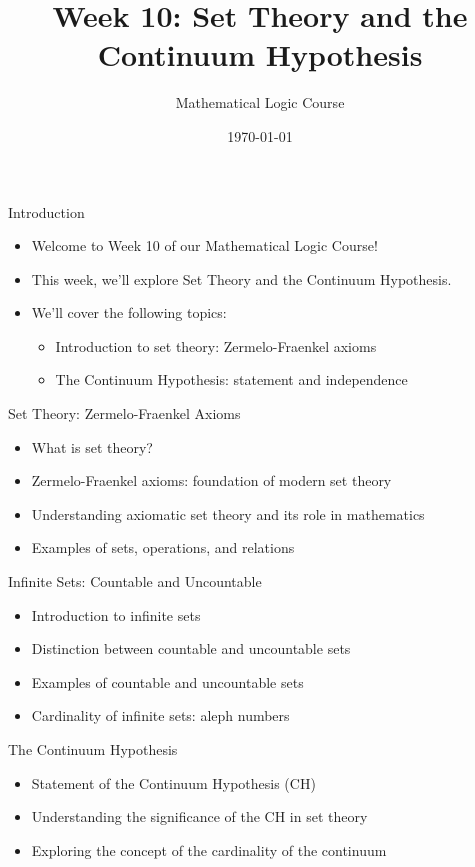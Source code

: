 \documentclass[presentation]{beamer}
\author{Mathematical Logic Course}
\date{\today}
\title{Week 10: Set Theory and the Continuum Hypothesis}
\begin{document}
\maketitle

\begin{frame}[label={sec:orgfb3648e}]{Introduction}
\begin{itemize}
\item Welcome to Week 10 of our Mathematical Logic Course!
\item This week, we'll explore Set Theory and the Continuum Hypothesis.
\item We'll cover the following topics:
\begin{itemize}
\item Introduction to set theory: Zermelo-Fraenkel axioms
\item The Continuum Hypothesis: statement and independence
\end{itemize}
\end{itemize}
\end{frame}

\begin{frame}[label={sec:org19d0cd0}]{Set Theory: Zermelo-Fraenkel Axioms}
\begin{itemize}
\item What is set theory?
\item Zermelo-Fraenkel axioms: foundation of modern set theory
\item Understanding axiomatic set theory and its role in mathematics
\item Examples of sets, operations, and relations
\end{itemize}
\end{frame}

\begin{frame}[label={sec:orgd1dadfa}]{Infinite Sets: Countable and Uncountable}
\begin{itemize}
\item Introduction to infinite sets
\item Distinction between countable and uncountable sets
\item Examples of countable and uncountable sets
\item Cardinality of infinite sets: aleph numbers
\end{itemize}
\end{frame}

\begin{frame}[label={sec:orgbaf64c7}]{The Continuum Hypothesis}
\begin{itemize}
\item Statement of the Continuum Hypothesis (CH)
\item Understanding the significance of the CH in set theory
\item Exploring the concept of the cardinality of the continuum
\end{itemize}
\end{frame}
\end{document}
